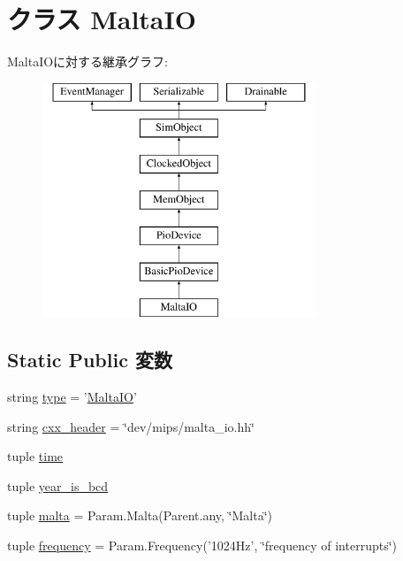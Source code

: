 \hypertarget{classMalta_1_1MaltaIO}{
\section{クラス MaltaIO}
\label{classMalta_1_1MaltaIO}
}
MaltaIOに対する継承グラフ:\begin{figure}[H]
\begin{center}
\leavevmode
\includegraphics[height=7cm]{classMalta_1_1MaltaIO}
\end{center}
\end{figure}
\subsection*{Static Public 変数}
\begin{DoxyCompactItemize}
\item 
string \hyperlink{classMalta_1_1MaltaIO_acce15679d830831b0bbe8ebc2a60b2ca}{type} = '\hyperlink{classMalta_1_1MaltaIO}{MaltaIO}'
\item 
string \hyperlink{classMalta_1_1MaltaIO_a17da7064bc5c518791f0c891eff05fda}{cxx\_\-header} = \char`\"{}dev/mips/malta\_\-io.hh\char`\"{}
\item 
tuple \hyperlink{classMalta_1_1MaltaIO_a429c35172fbcb8b1788bead147e4719b}{time}
\item 
tuple \hyperlink{classMalta_1_1MaltaIO_aaec21bf266d8a17759fe4f5bf79b06fb}{year\_\-is\_\-bcd}
\item 
tuple \hyperlink{classMalta_1_1MaltaIO_ae688b1cb082350c971cc4aaf26b66104}{malta} = Param.Malta(Parent.any, \char`\"{}Malta\char`\"{})
\item 
tuple \hyperlink{classMalta_1_1MaltaIO_aa6caae816bc3cac7f328268ca3cdf2f7}{frequency} = Param.Frequency('1024Hz', \char`\"{}frequency of interrupts\char`\"{})
\end{DoxyCompactItemize}


